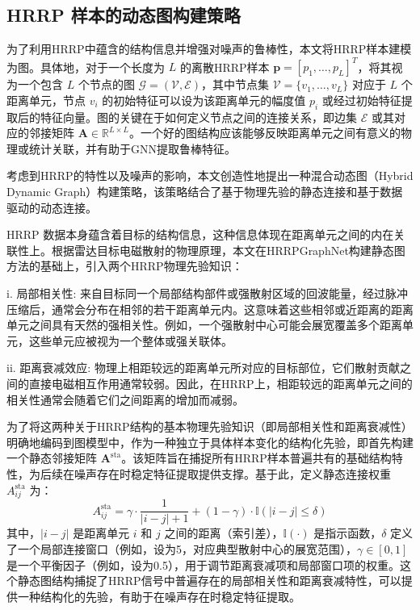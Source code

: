\subsection{HRRP 样本的动态图构建策略}
\label{subsec:dynamic_graph_construction}

为了利用HRRP中蕴含的结构信息并增强对噪声的鲁棒性，本文将HRRP样本建模为图。具体地，对于一个长度为 $L$ 的离散HRRP样本 $\mathbf{p} = [p_1, \dots, p_L]^T$，将其视为一个包含 $L$ 个节点的图 $\mathcal{G} = (\mathcal{V}, \mathcal{E})$，其中节点集 $\mathcal{V} = \{v_1, \dots, v_L\}$ 对应于 $L$ 个距离单元，节点 $v_i$ 的初始特征可以设为该距离单元的幅度值 $p_i$ 或经过初始特征提取后的特征向量。图的关键在于如何定义节点之间的连接关系，即边集 $\mathcal{E}$ 或其对应的邻接矩阵 $\mathbf{A} \in \mathbb{R}^{L \times L}$。一个好的图结构应该能够反映距离单元之间有意义的物理或统计关联，并有助于GNN提取鲁棒特征。

考虑到HRRP的特性以及噪声的影响，本文创造性地提出一种混合动态图（Hybrid Dynamic Graph）构建策略，该策略结合了基于物理先验的静态连接和基于数据驱动的动态连接。

HRRP 数据本身蕴含着目标的结构信息，这种信息体现在距离单元之间的内在关联性上。根据雷达目标电磁散射的物理原理，本文在HRRPGraphNet构建静态图方法的基础上，引入两个HRRP物理先验知识：

i.  局部相关性: 来自目标同一个局部结构部件或强散射区域的回波能量，经过脉冲压缩后，通常会分布在相邻的若干距离单元内。这意味着这些相邻或近距离的距离单元之间具有天然的强相关性。例如，一个强散射中心可能会展宽覆盖多个距离单元，这些单元应被视为一个整体或强关联体。

ii.  距离衰减效应: 物理上相距较远的距离单元所对应的目标部位，它们散射贡献之间的直接电磁相互作用通常较弱。因此，在HRRP上，相距较远的距离单元之间的相关性通常会随着它们之间距离的增加而减弱。

为了将这两种关于HRRP结构的基本物理先验知识（即局部相关性和距离衰减性）明确地编码到图模型中，作为一种独立于具体样本变化的结构化先验，即首先构建一个静态邻接矩阵 $\mathbf{A}^{\text{sta}}$。该矩阵旨在捕捉所有HRRP样本普遍共有的基础结构特性，为后续在噪声存在时稳定特征提取提供支撑。基于此，定义静态连接权重 $A^{\text{sta}}_{ij}$ 为：
\begin{equation}
    A^{\text{sta}}_{ij} = \gamma \cdot \frac{1}{|i-j|+1} + (1-\gamma) \cdot \mathbb{I}(|i-j| \leq \delta)
    \label{eq:static_adjacency}
\end{equation}
其中，$|i-j|$ 是距离单元 $i$ 和 $j$ 之间的距离（索引差），$\mathbb{I}(\cdot)$ 是指示函数，$\delta$ 定义了一个局部连接窗口（例如，设为5，对应典型散射中心的展宽范围），$\gamma \in [0,1]$ 是一个平衡因子（例如，设为0.5），用于调节距离衰减项和局部窗口项的权重。这个静态图结构捕捉了HRRP信号中普遍存在的局部相关性和距离衰减特性，可以提供一种结构化的先验，有助于在噪声存在时稳定特征提取。

